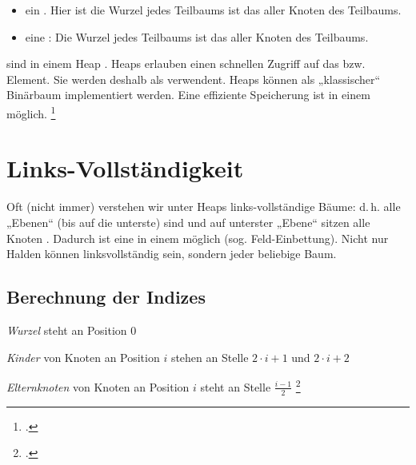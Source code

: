 \documentclass{lehramt-informatik-haupt}
\begin{document}
\begin{itemize}
\item ein . Hier ist die Wurzel jedes Teilbaums ist das
 aller Knoten des Teilbaums.
%
\item eine : Die Wurzel jedes Teilbaums ist das
 aller Knoten des Teilbaums.
\end{itemize}
%
 sind in einem Heap .
%
Heaps erlauben einen schnellen Zugriff auf das  bzw.
 Element. Sie werden deshalb als
 verwendent.
%
Heaps können als „klassischer“ Binärbaum implementiert werden. Eine
effiziente Speicherung ist in einem  möglich.
\footcite[Seite 22]{aud:fs:tafeluebung-11}

%

\section{Links-Vollständigkeit}

Oft (nicht immer) verstehen wir unter Heaps links-vollständige Bäume:
d.\,h. alle „Ebenen“ (bis auf die unterste) sind 
und auf unterster „Ebene“ sitzen alle Knoten . Dadurch ist eine  in einem
 möglich (sog. Feld-Einbettung). Nicht nur Halden können
linksvollständig sein, sondern jeder beliebige Baum.

%

\subsection{Berechnung der Indizes}

\begin{compactitem}
\item \emph{Wurzel} steht an Position $0$

\item \emph{Kinder} von Knoten an Position $i$ stehen an Stelle
$2 \cdot i + 1$ und $2 \cdot i + 2$

\item \emph{Elternknoten} von Knoten an Position $i$ steht an Stelle
$\frac{i - 1}{2}$
\footcite[Seite 26]{aud:fs:tafeluebung-11}
\end{compactitem}
\end{document}
